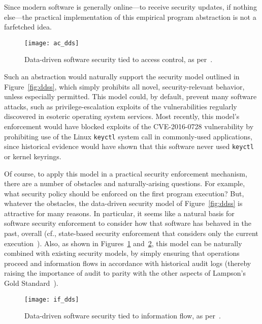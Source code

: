 \documentclass{IEEEtran}
\begin{document}
Since modern software is generally online---to receive security updates, if nothing else---the practical implementation of this empirical program abstraction is not a farfetched idea.



\begin{figure}[t]
\centering
\texttt{[image: ac\_dds]}\vspace*{-1.4em}
\caption{Data-driven software security tied to access control, as per~\cite{LampsonRealWorld}.}\label{fig:ddsacls}
\end{figure}


Such an abstraction would naturally support the security model outlined in Figure~\ref{fig:ddss}, which simply prohibits all novel, security-relevant behavior, unless especially permitted.
This model could, by default, prevent many software attacks,
such as privilege-escalation exploits 
of the vulnerabilities
regularly discovered in esoteric operating system services.
Most recently,
this model's enforcement would have blocked exploits of the CVE-2016-0728 vulnerability
by prohibiting use of the Linux \texttt{keyctl} system call\label{ref:keyctl}
in commonly-used applications,
since historical evidence 
would have shown that this software never used \texttt{keyctl} or kernel keyrings. 

Of course, to apply this model in a practical security enforcement mechanism, there are a number of obstacles and naturally-arising questions.
For example, what security policy should be enforced on the first program execution?
But, whatever the obstacles,
the data-driven security model of Figure~\ref{fig:ddss}
is attractive for many reasons.
In particular, 
it seems like a natural basis for software security enforcement
to consider how that software has behaved in the past, overall
(cf., state-based security enforcement
that considers only the current execution~\cite{hbac}).
Also,
as shown in Figures~\ref{fig:ddsacls} and~\ref{fig:ddsif},
this model can be naturally combined with existing security models,
by simply ensuring that operations proceed and information flows
in accordance with historical audit logs 
(thereby raising the importance of audit to parity with 
the other aspects of Lampson's Gold Standard~\cite{LampsonRealWorld}).


\begin{figure}[t]
\vspace*{0.43in}
\centering
\texttt{[image: if\_dds]}\vspace*{-1em}
\caption{Data-driven software security tied to information flow, as per~\cite{LampsonRealWorld}.}\label{fig:ddsif}
\end{figure}
\end{document}
